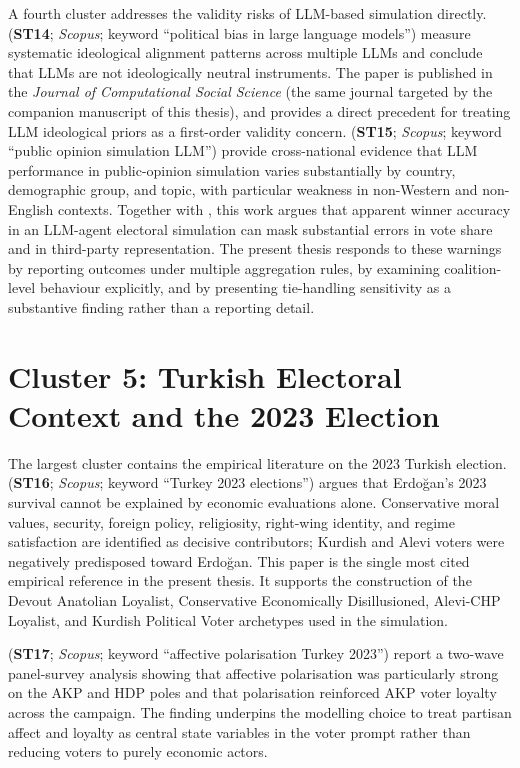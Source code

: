 \documentclass[12pt,a4paper]{report}
\begin{document}
A fourth cluster addresses the validity risks of LLM-based simulation directly. \citet{rettenberger2025politicalbias} (\textbf{ST14}; \emph{Scopus}; keyword \enquote{political bias in large language models}) measure systematic ideological alignment patterns across multiple LLMs and conclude that LLMs are not ideologically neutral instruments. The paper is published in the \emph{Journal of Computational Social Science} (the same journal targeted by the companion manuscript of this thesis), and provides a direct precedent for treating LLM ideological priors as a first-order validity concern. \citet{qu2024performance} (\textbf{ST15}; \emph{Scopus}; keyword \enquote{public opinion simulation LLM}) provide cross-national evidence that LLM performance in public-opinion simulation varies substantially by country, demographic group, and topic, with particular weakness in non-Western and non-English contexts. Together with \citet{kang2026dynamok}, this work argues that apparent winner accuracy in an LLM-agent electoral simulation can mask substantial errors in vote share and in third-party representation. The present thesis responds to these warnings by reporting outcomes under multiple aggregation rules, by examining coalition-level behaviour explicitly, and by presenting tie-handling sensitivity as a substantive finding rather than a reporting detail.

\section{Cluster 5: Turkish Electoral Context and the 2023 Election}
\label{sec:litcluster5}

The largest cluster contains the empirical literature on the 2023 Turkish election. \citet{carkoglu2024unlikely} (\textbf{ST16}; \emph{Scopus}; keyword \enquote{Turkey 2023 elections}) argues that Erdo\u{g}an's 2023 survival cannot be explained by economic evaluations alone. Conservative moral values, security, foreign policy, religiosity, right-wing identity, and regime satisfaction are identified as decisive contributors; Kurdish and Alevi voters were negatively predisposed toward Erdo\u{g}an. This paper is the single most cited empirical reference in the present thesis. It supports the construction of the Devout Anatolian Loyalist, Conservative Economically Disillusioned, Alevi-CHP Loyalist, and Kurdish Political Voter archetypes used in the simulation.

\citet{aytac2025polarised} (\textbf{ST17}; \emph{Scopus}; keyword \enquote{affective polarisation Turkey 2023}) report a two-wave panel-survey analysis showing that affective polarisation was particularly strong on the AKP and HDP poles and that polarisation reinforced AKP voter loyalty across the campaign. The finding underpins the modelling choice to treat partisan affect and loyalty as central state variables in the voter prompt rather than reducing voters to purely economic actors.
\end{document}
